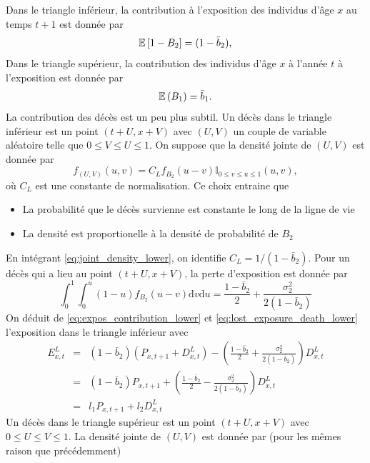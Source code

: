 Dans le triangle inférieur, la contribution à l'exposition des individus d'âge $x$ au temps $t+1$ est donnée par 
\begin{equation}\label{eq:expos_contribution_lower}
\mathbb{E}\left[1-B_2\right] = (1-\bar{b}_2), 
\end{equation}
Dans le triangle supérieur, la contribution des individus d'âge $x$ à l'année $t$ à l'exposition  est donnée par 
\begin{equation}\label{eq:expos_contribution_upper}
\mathbb{E}\left(B_1\right)=\bar{b}_1.
\end{equation}
La contribution des décès est un peu plus subtil. Un décès dans le triangle inférieur est un point $(t+U, x+V)$ avec $(U,V)$ un couple de variable aléatoire telle que $0\leq V\leq U\leq 1$. On suppose que la densité jointe de $(U,V)$ est donnée par 
\begin{equation}\label{eq:joint_density_lower}
f_{(U,V)}(u,v) = C_L f_{B_{2}}(u-v)\mathbb{I}_{0\leq v\leq u\leq 1}(u,v),
\end{equation}
où $C_L$ est une constante de normalisation. Ce choix entraine que 
\begin{itemize}
  \item La probabilité que le décès survienne est constante le long de la ligne de vie
  \item La densité est proportionelle à la densité de probabilité de $B_2$
\end{itemize}
En intégrant \eqref{eq:joint_density_lower}, on identifie $C_L = 1/(1-\bar{b}_{2})$. Pour un décès qui a lieu au point $(t+U, x+V)$, la perte d'exposition est donnée par 
\begin{equation}\label{eq:lost_exposure_death_lower}
\int_{0}^1\int_{0}^u(1-u)f_{B_2}(u-v)\text{d}v\text{d}u = \frac{1-\bar{b}_2}{2}+\frac{\sigma_2^2}{2(1-\bar{b}_2)}
\end{equation}
On déduit de \eqref{eq:expos_contribution_lower} et \eqref{eq:lost_exposure_death_lower} l'exposition dans le triangle inférieur avec 
\begin{eqnarray*}
E^L_{x,t}&=&(1-\bar{b}_2)(P_{x,t+1}+D^L_{x,t}) - \left(\frac{1-\bar{b}_2}{2}+\frac{\sigma_2^2}{2(1-\bar{b}_2)}\right)D^L_{x,t}\\
& =& (1-\bar{b}_2)P_{x,t+1} + \left(\frac{1-\bar{b}_2}{2}-\frac{\sigma_2^2}{2(1-\bar{b}_2)}\right)D^L_{x,t}\\
&=& l_1P_{x,t+1} + l_2 D^L_{x,t}
\end{eqnarray*}
Un décès dans le triangle supérieur est un point $(t+U, x+ V)$ avec $0\leq U\leq V\leq 1$. La densité jointe de $(U,V)$ est donnée par (pour les mêmes raison que précédemment)
